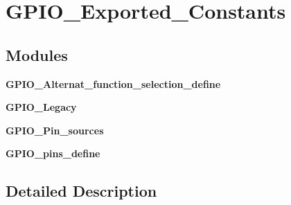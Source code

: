 \section{G\+P\+I\+O\+\_\+\+Exported\+\_\+\+Constants}
\label{group__GPIO__Exported__Constants}
\subsection*{Modules}
\begin{DoxyCompactItemize}
\item 
\textbf{ G\+P\+I\+O\+\_\+\+Alternat\+\_\+function\+\_\+selection\+\_\+define}
\item 
\textbf{ G\+P\+I\+O\+\_\+\+Legacy}
\item 
\textbf{ G\+P\+I\+O\+\_\+\+Pin\+\_\+sources}
\item 
\textbf{ G\+P\+I\+O\+\_\+pins\+\_\+define}
\end{DoxyCompactItemize}


\subsection{Detailed Description}
